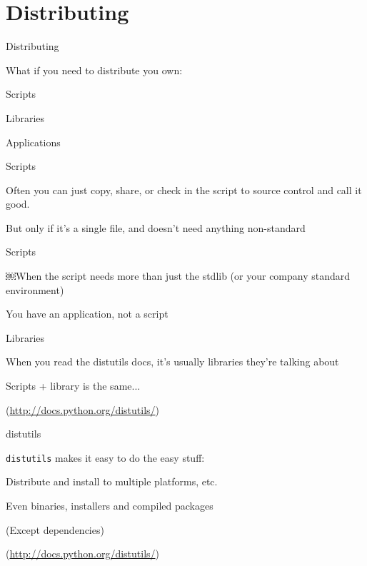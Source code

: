 \documentclass{beamer}
\begin{document}
\section{Distributing}

\begin{frame}[fragile]{Distributing}

{\LARGE What if you need to distribute you own:}

\vfill
{\Large Scripts}

\vfill
{\large Libraries }

\vfill
{\large Applications }
\vfill

\end{frame} 

\begin{frame}[fragile]{Scripts}

\vfill
{\LARGE Often you can just copy, share, or check in the script to source
control and call it good.}

\vfill
But only if it's a single file, and doesn't need anything non-standard
\end{frame} 

\begin{frame}[fragile]{Scripts}

\vfill
{\LARGE ￼When the script needs more than just the stdlib (or your company standard environment)}

\vfill
{\LARGE You have an application, not a script}

\vfill

\end{frame} 

\begin{frame}[fragile]{Libraries}

\vfill
{\LARGE When you read the distutils docs, it's usually libraries they're talking about}


\vfill
{\LARGE Scripts + library is the same...}


\vfill
(\url{http://docs.python.org/distutils/})
\end{frame} 

\begin{frame}[fragile]{distutils}

\vfill
{\LARGE \verb|distutils| makes it easy to do the easy stuff:}

\vfill
{\Large Distribute and install to multiple platforms, etc.}

\vfill
{\Large Even binaries, installers and compiled packages}

\vfill
{\Large (Except dependencies)}

\vfill
(\url{http://docs.python.org/distutils/})
\end{frame} 
\end{document}
